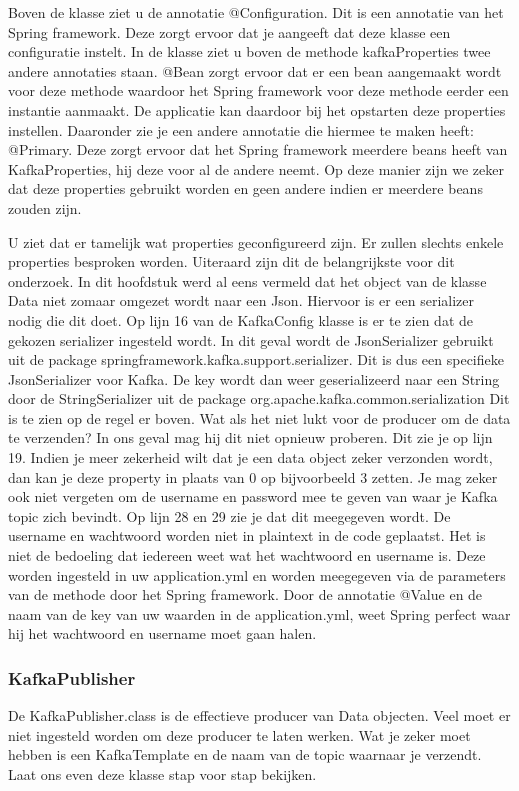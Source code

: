 Boven de klasse ziet u de annotatie @Configuration. Dit is een annotatie van het Spring framework. Deze zorgt ervoor dat je aangeeft dat deze klasse een configuratie instelt. In de klasse ziet u boven de methode kafkaProperties twee andere annotaties staan. @Bean zorgt ervoor dat er een bean aangemaakt wordt voor deze methode waardoor het Spring framework voor deze methode eerder een instantie aanmaakt. De applicatie kan daardoor bij het opstarten deze properties instellen. Daaronder zie je een andere annotatie die hiermee te maken heeft: @Primary. Deze zorgt ervoor dat het Spring framework meerdere beans heeft van KafkaProperties, hij deze voor al de andere neemt. Op deze manier zijn we zeker dat deze properties gebruikt worden en geen andere indien er meerdere beans zouden zijn.

U ziet dat er tamelijk wat properties geconfigureerd zijn. Er zullen slechts enkele properties besproken worden. Uiteraard zijn dit de belangrijkste voor dit onderzoek. In dit hoofdstuk werd al eens vermeld dat het object van de klasse Data niet zomaar omgezet wordt naar een Json. Hiervoor is er een serializer nodig die dit doet. Op lijn 16 van de KafkaConfig klasse is er te zien dat de gekozen serializer ingesteld wordt. In dit geval wordt de JsonSerializer gebruikt uit de package springframework.kafka.support.serializer. Dit is dus een specifieke JsonSerializer voor Kafka. De key wordt dan weer geserializeerd naar een String door de StringSerializer uit de package org.apache.kafka.common.serialization Dit is te zien op de regel er boven. Wat als het niet lukt voor de producer om de data te verzenden? In ons geval mag hij dit niet opnieuw proberen. Dit zie je op lijn 19. Indien je meer zekerheid wilt dat je een data object zeker verzonden wordt, dan kan je deze property in plaats van 0 op bijvoorbeeld 3 zetten. Je mag zeker ook niet vergeten om de username en password mee te geven van waar je Kafka topic zich bevindt. Op lijn 28 en 29 zie je dat dit meegegeven wordt. De username en wachtwoord worden niet in plaintext in de code geplaatst. Het is niet de bedoeling dat iedereen weet wat het wachtwoord en username is. Deze worden ingesteld in uw application.yml en worden meegegeven via de parameters van de methode door het Spring framework. Door de annotatie @Value en de naam van de key van uw waarden in de application.yml, weet Spring perfect waar hij het wachtwoord en username moet gaan halen.

\subsubsection{KafkaPublisher}
De KafkaPublisher.class is de effectieve producer van Data objecten. Veel moet er niet ingesteld worden om deze producer te laten werken. Wat je zeker moet hebben is een KafkaTemplate en de naam van de topic waarnaar je verzendt. Laat ons even deze klasse stap voor stap bekijken.

